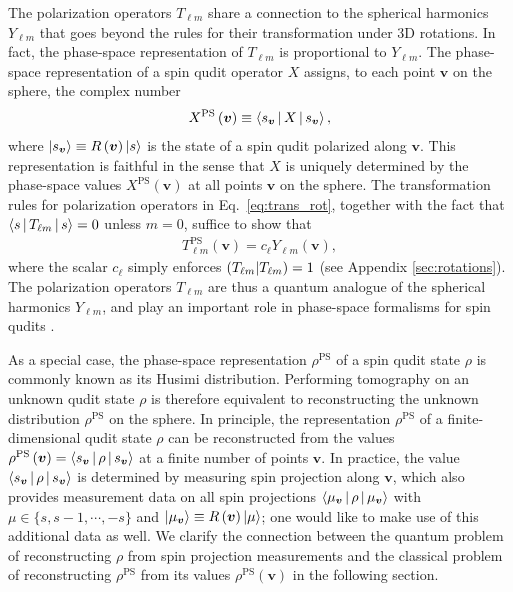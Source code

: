 \documentclass[nofootinbib,twocolumn]{revtex4-1}
\renewcommand{\t}{\text} %
\newcommand{\p}[1]{\left(#1\right)} %
\newcommand{\bk}{\Braket} %
\renewcommand{\set}[1]{\{#1\}} %
\def\obk#1{\mathinner{({#1})}}
\begin{document}
The polarization operators $T_{\ell m}$ share a connection to the spherical harmonics $Y_{\ell m}$ that goes beyond the rules for their transformation under 3D rotations.
In fact, the phase-space representation of $T_{\ell m}$ is proportional to $Y_{\ell m}$.
The phase-space representation of a spin qudit operator $X$ assigns, to each point $\bm v$ on the sphere, the complex number
\begin{align}
  X^{\t{PS}}\p{\bm v} \equiv \bk{s_{\bm v}|X|s_{\bm v}},
\end{align}
where $\ket{s_{\bm v}}\equiv R\p{\bm v}\ket{s}$ is the state of a spin qudit polarized along $\bm v$.
This representation is faithful in the sense that $X$ is uniquely determined by the phase-space values $X^{\t{PS}}\p{\bm v}$ at all points $\bm v$ on the sphere.
The transformation rules for polarization operators in Eq.~\eqref{eq:trans_rot}, together with the fact that $\bk{s|T_{\ell m}|s}=0$ unless $m=0$, suffice to show that
\begin{align}
  T_{\ell m}^{\t{PS}}\p{\bm v} = c_\ell Y_{\ell m}\p{\bm v},
\end{align}
where the scalar $c_\ell$ simply enforces $\obk{T_{\ell m}|T_{\ell m}}=1$ (see Appendix \ref{sec:rotations}).
The polarization operators $T_{\ell m}$ are thus a quantum analogue of the spherical harmonics $Y_{\ell m}$, and play an important role in phase-space formalisms for spin qudits \cite{li2013weylwignermoyal}.

As a special case, the phase-space representation $\rho^{\t{PS}}$ of a spin qudit state $\rho$ is commonly known as its Husimi distribution.
Performing tomography on an unknown qudit state $\rho$ is therefore equivalent to reconstructing the unknown distribution $\rho^{\t{PS}}$ on the sphere.
In principle, the representation $\rho^{\t{PS}}$ of a finite-dimensional qudit state $\rho$ can be reconstructed from the values $\rho^{\t{PS}}\p{\bm v}=\bk{s_{\bm v}|\rho|s_{\bm v}}$ at a finite number of points $\bm v$.
In practice, the value $\bk{s_{\bm v}|\rho|s_{\bm v}}$ is determined by measuring spin projection along $\bm v$, which also provides measurement data on all spin projections $\bk{\mu_{\bm v}|\rho|\mu_{\bm v}}$ with $\mu\in\set{s,s-1,\cdots,-s}$ and $\ket{\mu_{\bm v}}\equiv R\p{\bm v}\ket{\mu}$; one would like to make use of this additional data as well.
We clarify the connection between the quantum problem of reconstructing $\rho$ from spin projection measurements and the classical problem of reconstructing $\rho^{\t{PS}}$ from its values $\rho^{\t{PS}}\p{\bm v}$ in the following section.
\end{document}
